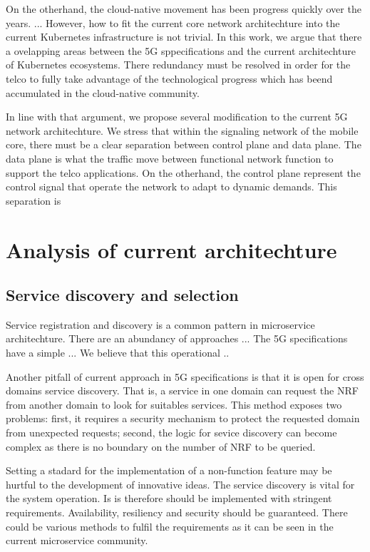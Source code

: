 \documentclass[a4paper]{article}
\begin{document}
On the otherhand, the cloud-native movement has been progress quickly over the years. 
... However, how to fit the current core network architechture into the current Kubernetes infrastructure is not trivial. In this work, we argue that there a ovelapping areas between the 5G sppecifications and the current architechture of Kubernetes ecosystems. There redundancy must be resolved in order for the telco to fully take advantage of the technological progress which has beend accumulated in the cloud-native community.

In line with that argument, we propose several modification to the current 5G network architechture. We stress that within the signaling network of the mobile core, there must be a clear separation between control plane and data plane. The data plane is what the traffic move between functional network function to support the telco applications. On the otherhand, the control plane represent the control signal that operate the network to adapt to dynamic demands. This separation is 



\section{Analysis of current architechture}

\subsection{Service discovery and selection}

Service registration and discovery is a common pattern in microservice architechture. There are an abundancy of approaches ... The 5G specifications have a simple ... We believe that this operational ..

Another pitfall of current approach in 5G specifications is that it is open for cross domains service discovery. That is, a service in one domain can request the NRF from another domain to look for suitables services. This method exposes two problems: first, it requires a security mechanism to protect the requested domain from unexpected requests; second, the logic for sevice discovery can become complex as there is no boundary on the number of NRF to be queried.


Setting a stadard for the implementation of a non-function feature may be hurtful to the development of innovative ideas. 
The service discovery is vital for the system operation. Is is therefore should be implemented with stringent requirements. Availability, resiliency and security should be guaranteed. There could be various methods to fulfil the requirements as it can be seen in the current microservice community.
\end{document}

